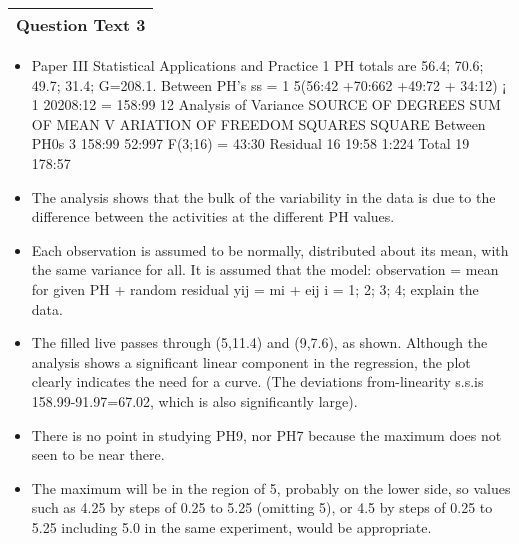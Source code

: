 \documentclass[a4paper,12pt]{article}
\begin{document}
\begin{table}[ht!]
 \centering
 \begin{tabular}{|p{15cm}|}
 \hline  
Question Text 3 
\\ \hline
  \end{tabular}
\end{table}
\begin{itemize}
\item 


Paper III
Statistical Applications and Practice
1 PH totals are 56.4; 70.6; 49.7; 31.4; G=208.1. Between PH’s ss = 1
5(56:42 +70:662 +49:72 +
34:12) ¡ 1
20208:12 = 158:99
12
Analysis of Variance
SOURCE OF DEGREES SUM OF MEAN
V ARIATION OF FREEDOM SQUARES SQUARE
Between PH0s 3 158:99 52:997 F(3;16) = 43:30
Residual 16 19:58 1:224
Total 19 178:57
\item The analysis shows that the bulk of the variability in the data is due to the difference
between the activities at the different PH values.
\item Each observation is assumed to be normally,
distributed about its mean, with the same variance for all. It is assumed that the model:
observation = mean for given PH + random residual yij = mi + eij i = 1; 2; 3; 4; explain
the data.
\item The filled live passes through (5,11.4) and (9,7.6), as shown. Although the analysis shows a significant
linear component in the regression, the plot clearly indicates the need for a curve. (The
deviations from-linearity s.s.is 158.99-91.97=67.02, which is also significantly large). 
\item There is
no point in studying PH9, nor PH7 because the maximum does not seen to be near there.
\item The maximum will be in the region of 5, probably on the lower side, so values such as 4.25
by steps of 0.25 to 5.25 (omitting 5), or 4.5 by steps of 0.25 to 5.25 including 5.0 in the same
experiment, would be appropriate.

\end{itemize}
\end{document}
